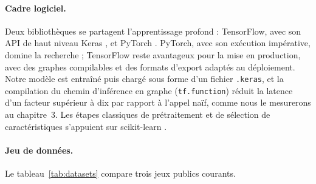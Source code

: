 \paragraph{Cadre logiciel.}
Deux bibliothèques se partagent l'apprentissage profond : TensorFlow, avec son API de haut niveau Keras \cite{abadi2016tensorflow}, et PyTorch \cite{paszke2019pytorch}. PyTorch, avec son exécution impérative, domine la recherche ; TensorFlow reste avantageux pour la mise en production, avec des graphes compilables et des formats d'export adaptés au déploiement. Notre modèle est entraîné puis chargé sous forme d'un fichier \texttt{.keras}, et la compilation du chemin d'inférence en graphe (\texttt{tf.function}) réduit la latence d'un facteur supérieur à dix par rapport à l'appel naïf, comme nous le mesurerons au chapitre~3. Les étapes classiques de prétraitement et de sélection de caractéristiques s'appuient sur scikit-learn \cite{pedregosa2011sklearn}.

\paragraph{Jeu de données.}
Le tableau~\ref{tab:datasets} compare trois jeux publics courants.


